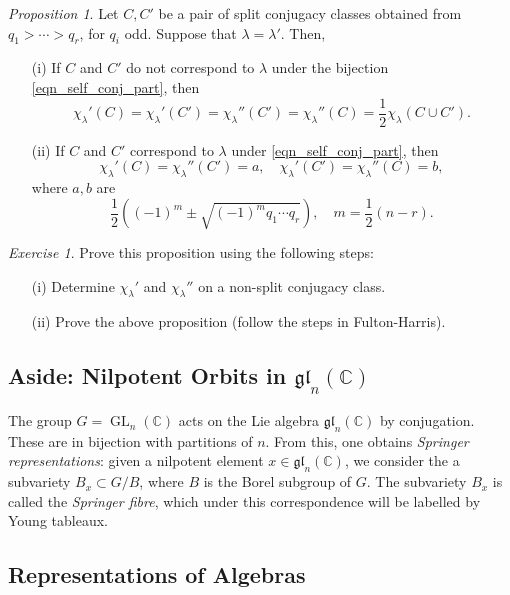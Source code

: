 \documentclass[a4paper]{report}
\theoremstyle{definition}
\theoremstyle{remark}
\theoremstyle{proposition}
\newtheorem{proposition}{Proposition}
\theoremstyle{conjecture}
\theoremstyle{lemma}
\theoremstyle{corollary}
\theoremstyle{exercise}
\newtheorem{exercise}{Exercise}
\theoremstyle{example}
\newcommand{\C}{\mathbb{C}}
\newcommand{\on}{\operatorname}
\begin{document}
\begin{proposition}
    Let $C,C'$ be a pair of split conjugacy classes obtained from 
    $q_1>\cdots>q_r$, for $q_i$ odd. Suppose that $\lambda=\lambda'$.
    Then,
    \begin{itemize}
        \item[(i)] If $C$ and $C'$ do not correspond to $\lambda$
            under the bijection \eqref{eqn_self_conj_part},
            then
            $$\chi_\lambda' (C) = \chi_\lambda'(C') = \chi_\lambda''(C') = \chi_\lambda''(C) = \frac{1}{2}\chi_\lambda(C\cup C').$$
        \item[(ii)] If $C$ and $C'$ correspond to $\lambda$ 
            under \eqref{eqn_self_conj_part}, then
            $$\chi_\lambda'(C) = \chi_\lambda''(C') = a,\quad \chi_\lambda'(C') = \chi_\lambda''(C) = b,$$
            where $a,b$ are
            $$\frac{1}{2}\left( (-1)^m \pm \sqrt{(-1)^mq_1\cdots q_r}\right),\quad m = \frac{1}{2}(n-r).$$
    \end{itemize}
\end{proposition}

\begin{exercise}
    Prove this proposition using the following steps:
    \begin{itemize}
        \item[(i)] Determine $\chi_\lambda'$ and $\chi_\lambda''$ on a 
            non-split conjugacy class.
        \item[(ii)] Prove the above proposition (follow the steps in
            Fulton-Harris).
    \end{itemize}
\end{exercise}

\subsection{Aside: Nilpotent Orbits in $\mathfrak{gl}_n(\C)$}

The group $G=\on{GL}_n(\C)$ acts on the Lie algebra $\mathfrak{gl}_n(\C)$
by conjugation. These are in bijection with partitions of $n$. 
From this, one obtains \emph{Springer representations}:
given a nilpotent element $x\in \mathfrak{gl}_n(\C)$, we consider the 
a subvariety $B_x \subset G/B$, where $B$ is the Borel subgroup of $G$.
The subvariety $B_x$ is called the \emph{Springer fibre}, which under
this correspondence will be labelled by Young tableaux.

\subsection{Representations of Algebras}
\end{document}
